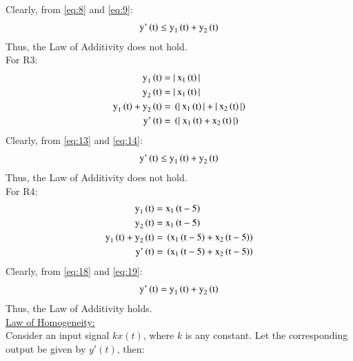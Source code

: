 \documentclass[journal,12pt,twocolumn]{IEEEtran}
\begin{document}
Clearly, from \eqref{eq:8} and \eqref{eq:9}:
\begin{align}
\label{eq:10}
    \text{y'}\left(\text{t}\right) \leq \text{y}_1\left(\text{t}\right) +\text{y}_2\left(\text{t}\right) 
\end{align}
Thus, the Law of Additivity does not hold.\\
For R3:
\begin{align}
\label{eq:11}
    \text{y}_1\left(\text{t}\right) ={}& |\:\text{x}_{1}\left(\text{t}\right)|\\
    \label{eq:12}
    \text{y}_2\left(\text{t}\right)  ={}& |\:\text{x}_{1}\left(\text{t}\right)|\\
    \label{eq:13}
   \text{y}_1\left(\text{t}\right) +\text{y}_2\left(\text{t}\right)  ={}& \left(|\:\text{x}_{1}\left(\text{t}\right)|+|\:\text{x}_{2}\left(\text{t}\right)|\right)\\
   \label{eq:14}
 \text{y'}\left(\text{t}\right) ={}& \left(|\;\text{x}_{1}\left(\text{t}\right)+\text{x}_{2}\left(\text{t}\right)|\right)
\end{align}
Clearly, from \eqref{eq:13} and \eqref{eq:14}:
\begin{align}
\label{eq:15}
    \text{y'}\left(\text{t}\right) \leq \text{y}_1\left(\text{t}\right) +\text{y}_2\left(\text{t}\right) 
\end{align}
Thus, the Law of Additivity does not hold.\\

For R4:
\begin{align}
\label{eq:16}
    \text{y}_1\left(\text{t}\right) ={}& \text{x}_{1}\left(\text{t}-5\right)\\
    \label{eq:17}
    \text{y}_2\left(\text{t}\right)  ={}& \text{x}_{1}\left(\text{t}-5\right)\\
    \label{eq:18}
   \text{y}_1\left(\text{t}\right) +\text{y}_2\left(\text{t}\right)  ={}& \left(\text{x}_{1}\left(\text{t}-5\right)+\text{x}_{2}\left(\text{t}-5\right)\right)\\
   \label{eq:19}
 \text{y'}\left(\text{t}\right) ={}& \left(\text{x}_{1}\left(\text{t}-5\right)+\text{x}_{2}\left(\text{t}-5\right)\right)
\end{align}
Clearly, from \eqref{eq:18} and \eqref{eq:19}:
\begin{align}
\label{eq:20}
    \text{y'}\left(\text{t}\right) = \text{y}_1\left(\text{t}\right) +\text{y}_2\left(\text{t}\right) 
\end{align}
Thus, the Law of Additivity holds.\\



\underline{Law of Homogeneity: }\\
Consider an input signal $kx(t)$, where $k$ is any constant. Let the corresponding output be given by $y'(t)$, then:
\end{document}

